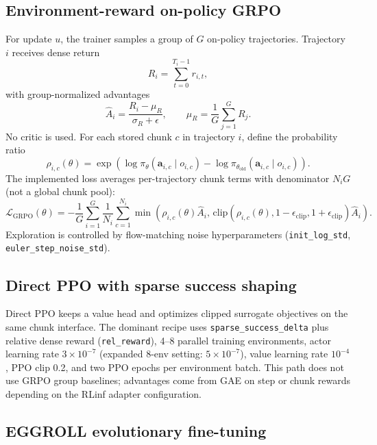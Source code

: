 \subsection{Environment-reward on-policy GRPO}
\label{sec:env-grpo-formulation}

For update $u$, the trainer samples a group of $G$ on-policy trajectories. Trajectory $i$ receives dense return
\[
R_i = \sum_{t=0}^{T_i-1} r_{i,t},
\]
with group-normalized advantages
\[
\hat{A}_i = \frac{R_i - \mu_R}{\sigma_R + \epsilon},
\qquad
\mu_R = \frac{1}{G}\sum_{j=1}^{G}R_j.
\]
No critic is used. For each stored chunk $c$ in trajectory $i$, define the probability ratio
\[
\rho_{i,c}(\theta) =
\exp\!\left(
\log \pi_{\theta}(\mathbf{a}_{i,c}\mid o_{i,c})
- \log \pi_{\theta_{\mathrm{old}}}(\mathbf{a}_{i,c}\mid o_{i,c})
\right).
\]
The implemented loss averages per-trajectory chunk terms with denominator $N_i G$ (not a global chunk pool):
\[
\mathcal{L}_{\mathrm{GRPO}}(\theta)
=
-\frac{1}{G}\sum_{i=1}^{G}
\frac{1}{N_i}\sum_{c=1}^{N_i}
\min\!\left(
\rho_{i,c}(\theta)\hat{A}_i,\,
\mathrm{clip}(\rho_{i,c}(\theta), 1-\epsilon_{\mathrm{clip}}, 1+\epsilon_{\mathrm{clip}})\hat{A}_i
\right).
\]
Exploration is controlled by flow-matching noise hyperparameters (\texttt{init\_log\_std}, \texttt{euler\_step\_noise\_std}).

\subsection{Direct PPO with sparse success shaping}
\label{sec:direct-ppo-formulation}

Direct PPO keeps a value head and optimizes clipped surrogate objectives on the same chunk interface. The dominant recipe uses \texttt{sparse\_success\_delta} plus relative dense reward (\texttt{rel\_reward}), 4--8 parallel training environments, actor learning rate $3\times10^{-7}$ (expanded 8-env setting: $5\times10^{-7}$), value learning rate $10^{-4}$, PPO clip 0.2, and two PPO epochs per environment batch. This path does not use GRPO group baselines; advantages come from GAE on step or chunk rewards depending on the RLinf adapter configuration.

\subsection{EGGROLL evolutionary fine-tuning}
\label{sec:eggroll-formulation}

